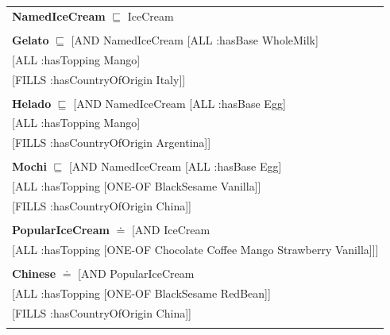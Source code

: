 \documentclass[12pt]{article}
\newcommand*{\MyIndent}{\hspace*{7em}}
\begin{document}
\begin{tabularx}{1\textwidth}{@{}X@{}}
            \textbf{NamedIceCream} $\sqsubseteq$ IceCream \\ \tabularnewline
            
            \textbf{Gelato} $\sqsubseteq$ [AND NamedIceCream [ALL :hasBase WholeMilk] \\
                                                   \MyIndent [ALL :hasTopping Mango] \\
                                                   \MyIndent [FILLS :hasCountryOfOrigin Italy]] \\
                                                   \tabularnewline
            
            \textbf{Helado} $\sqsubseteq$ [AND NamedIceCream [ALL :hasBase Egg] \\
                                                   \MyIndent [ALL :hasTopping Mango] \\
                                                   \MyIndent [FILLS :hasCountryOfOrigin Argentina]] \\
                                                   \tabularnewline

            \textbf{Mochi} $\sqsubseteq$ [AND NamedIceCream [ALL :hasBase Egg] \\
                                                  \MyIndent [ALL :hasTopping [ONE-OF BlackSesame Vanilla]] \\
                                                  \MyIndent [FILLS :hasCountryOfOrigin China]] \\
                                                  \tabularnewline

            \textbf{PopularIceCream} $\doteq$ [AND IceCream \\
                                                  \MyIndent [ALL :hasTopping [ONE-OF Chocolate Coffee Mango Strawberry Vanilla]]] \\
                                                  \tabularnewline

            \textbf{Chinese} $\doteq$ [AND PopularIceCream \\
                                                  \MyIndent [ALL :hasTopping [ONE-OF BlackSesame RedBean]] \\
                                                  \MyIndent [FILLS :hasCountryOfOrigin China]] \\
                                                  \tabularnewline


\end{tabularx}
\end{document}
